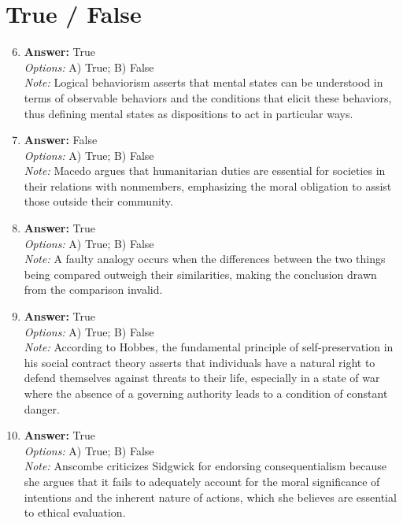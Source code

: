 \documentclass[12pt]{article}
\begin{document}
\section*{True / False}
\begin{enumerate}[label=\arabic*.]
\setcounter{enumi}{5}
\item \textbf{Answer:} True
\\ \textit{Options:} A) True; B) False
\\ \textit{Note:} Logical behaviorism asserts that mental states can be understood in terms of observable behaviors and the conditions that elicit these behaviors, thus defining mental states as dispositions to act in particular ways.
\item \textbf{Answer:} False
\\ \textit{Options:} A) True; B) False
\\ \textit{Note:} Macedo argues that humanitarian duties are essential for societies in their relations with nonmembers, emphasizing the moral obligation to assist those outside their community.
\item \textbf{Answer:} True
\\ \textit{Options:} A) True; B) False
\\ \textit{Note:} A faulty analogy occurs when the differences between the two things being compared outweigh their similarities, making the conclusion drawn from the comparison invalid.
\item \textbf{Answer:} True
\\ \textit{Options:} A) True; B) False
\\ \textit{Note:} According to Hobbes, the fundamental principle of self-preservation in his social contract theory asserts that individuals have a natural right to defend themselves against threats to their life, especially in a state of war where the absence of a governing authority leads to a condition of constant danger.
\item \textbf{Answer:} True
\\ \textit{Options:} A) True; B) False
\\ \textit{Note:} Anscombe criticizes Sidgwick for endorsing consequentialism because she argues that it fails to adequately account for the moral significance of intentions and the inherent nature of actions, which she believes are essential to ethical evaluation.
\end{enumerate}
\end{document}
